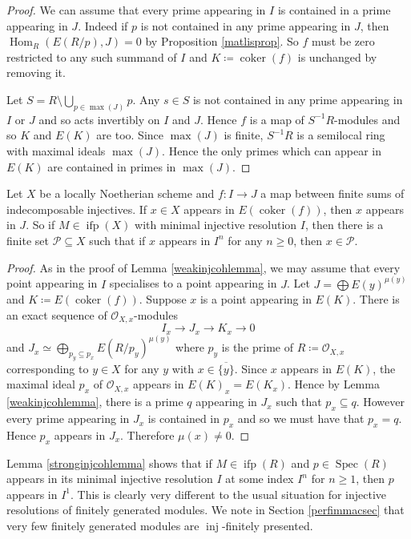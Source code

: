 \documentclass[12pt,oneside]{amsart}
\DeclareMathOperator*{\coker}{coker}
\DeclareMathOperator{\Hom}{Hom}
\DeclareMathOperator{\inj}{inj}
\DeclareMathOperator{\ifp}{ifp}
\DeclareMathOperator{\Spec}{Spec}
\begin{document}
\begin{proof}
We can assume that every prime appearing in $I$ is contained in a prime appearing in $J$. Indeed if $p$ is not contained in any prime appearing in $J$, then $\Hom_R(E(R/p),J) = 0$ by Proposition \ref{matlisprop}. So $f$ must be zero restricted to any such summand of $I$ and $K \coloneq \coker(f)$ is unchanged by removing it.

Let $S = R \setminus \bigcup_{p \in \max(J)} p$. Any $s \in S$ is not contained in any prime appearing in $I$ or $J$ and so acts invertibly on $I$ and $J$. Hence $f$ is a map of $S^{-1}R$-modules and so $K$ and $E(K)$ are too. Since $\max(J)$ is finite, $S^{-1}R$ is a semilocal ring with maximal ideals $\max(J)$. Hence the only primes which can appear in $E(K)$ are contained in primes in $\max(J)$.
\end{proof}



\begin{lemma} \label{stronginjcohlemma}
Let $X$ be a locally Noetherian scheme and $f: I \to J$ a map between finite sums of indecomposable injectives. If $x \in X$ appears in $E(\coker(f))$, then $x$ appears in $J$. So if $M \in \ifp(X)$ with minimal injective resolution $I$, then there is a finite set $\mathcal{P} \subseteq X$ such that if $x$ appears in $I^n$ for any $n \geq 0$, then $x \in \mathcal{P}$. 
\end{lemma}

\begin{proof}
As in the proof of Lemma \ref{weakinjcohlemma}, we may assume that every point appearing in $I$ specialises to a point appearing in $J$. Let $J = \bigoplus E(y)^{\mu(y)}$ and $K \coloneq E(\coker(f))$. Suppose $x$ is a point appearing in $E(K)$. There is an exact sequence of $\mathcal{O}_{X,x}$-modules
\[
I_x \to J_x \to K_x \to 0
\]
and $J_x \simeq \bigoplus_{p_y \subseteq p_x} E(R/p_y)^{\mu(y)}$ where $p_y$ is the prime of $R \coloneq \mathcal{O}_{X,x}$ corresponding to $y \in X$ for any $y$ with $x \in \overline{\{y\}}$. Since $x$ appears in $E(K)$, the maximal ideal $p_x$ of $\mathcal{O}_{X,x}$ appears in $E(K)_x = E(K_x)$. Hence by Lemma \ref{weakinjcohlemma}, there is a prime $q$ appearing in $J_x$ such that $p_x \subseteq q$. However every prime appearing in $J_x$ is contained in $p_x$ and so we must have that $p_x = q$. Hence $p_x$ appears in $J_x$. Therefore $\mu(x) \neq 0$. 
\end{proof}


\begin{remark} 
Lemma \ref{stronginjcohlemma} shows that if $M \in \ifp(R)$ and $p \in \Spec(R)$ appears in its minimal injective resolution $I$ at some index $I^n$ for $n \geq 1$, then $p$ appears in $I^1$. This is clearly very different to the usual situation for injective resolutions of finitely generated modules. We note in Section \ref{perfimmacsec} that very few finitely generated modules are $\inj$-finitely presented.  
\end{remark}
\end{document}
